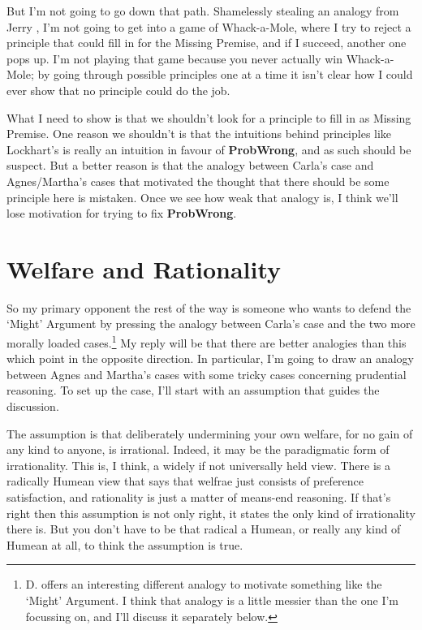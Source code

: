 But I'm not going to go down that path. Shamelessly stealing an analogy from Jerry  \citet{Fodor2000b}, I'm not going to get into a game of Whack-a-Mole, where I try to reject a principle that could fill in for the Missing Premise, and if I succeed, another one pops up. I'm not playing that game because you never actually win Whack-a-Mole; by going through possible principles one at a time it isn't clear how I could ever show that no principle could do the job.

What I need to show is that we shouldn't look for a principle to fill in as Missing Premise. One reason we shouldn't is that the intuitions behind principles like Lockhart's is really an intuition in favour of \textbf{ProbWrong}, and as such should be suspect. But a better reason is that the analogy between Carla's case and Agnes\slash Martha's cases that motivated the thought that there should be some principle here is mistaken. Once we see how weak that analogy is, I think we'll lose motivation for trying to fix \textbf{ProbWrong}.

\section{Welfare and Rationality}
\label{welfareandrationality}

So my primary opponent the rest of the way is someone who wants to defend the `Might' Argument by pressing the analogy between Carla's case and the two more morally loaded cases.\footnote{D.  \citet{Moller2011} offers an interesting different analogy to motivate something like the `Might' Argument. I think that analogy is a little messier than the one I'm focussing on, and I'll discuss it separately below.} My reply will be that there are better analogies than this which point in the opposite direction. In particular, I'm going to draw an analogy between Agnes and Martha's cases with some tricky cases concerning prudential reasoning. To set up the case, I'll start with an assumption that guides the discussion.

The assumption is that deliberately undermining your own welfare, for no gain of any kind to anyone, is irrational. Indeed, it may be the paradigmatic form of irrationality. This is, I think, a widely if not universally held view. There is a radically Humean view that says that welfrae just consists of preference satisfaction, and rationality is just a matter of means-end reasoning. If that's right then this assumption is not only right, it states the only kind of irrationality there is. But you don't have to be that radical a Humean, or really any kind of Humean at all, to think the assumption is true.

